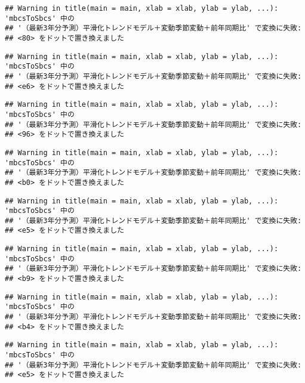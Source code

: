 \documentclass[]{article}
\begin{document}
\begin{verbatim}
## Warning in title(main = main, xlab = xlab, ylab = ylab, ...): 'mbcsToSbcs' 中の
## '（最新3年分予測）平滑化トレンドモデル＋変動季節変動＋前年同期比' で変換に失敗:
## <80> をドットで置き換えました
\end{verbatim}

\begin{verbatim}
## Warning in title(main = main, xlab = xlab, ylab = ylab, ...): 'mbcsToSbcs' 中の
## '（最新3年分予測）平滑化トレンドモデル＋変動季節変動＋前年同期比' で変換に失敗:
## <e6> をドットで置き換えました
\end{verbatim}

\begin{verbatim}
## Warning in title(main = main, xlab = xlab, ylab = ylab, ...): 'mbcsToSbcs' 中の
## '（最新3年分予測）平滑化トレンドモデル＋変動季節変動＋前年同期比' で変換に失敗:
## <96> をドットで置き換えました
\end{verbatim}

\begin{verbatim}
## Warning in title(main = main, xlab = xlab, ylab = ylab, ...): 'mbcsToSbcs' 中の
## '（最新3年分予測）平滑化トレンドモデル＋変動季節変動＋前年同期比' で変換に失敗:
## <b0> をドットで置き換えました
\end{verbatim}

\begin{verbatim}
## Warning in title(main = main, xlab = xlab, ylab = ylab, ...): 'mbcsToSbcs' 中の
## '（最新3年分予測）平滑化トレンドモデル＋変動季節変動＋前年同期比' で変換に失敗:
## <e5> をドットで置き換えました
\end{verbatim}

\begin{verbatim}
## Warning in title(main = main, xlab = xlab, ylab = ylab, ...): 'mbcsToSbcs' 中の
## '（最新3年分予測）平滑化トレンドモデル＋変動季節変動＋前年同期比' で変換に失敗:
## <b9> をドットで置き換えました
\end{verbatim}

\begin{verbatim}
## Warning in title(main = main, xlab = xlab, ylab = ylab, ...): 'mbcsToSbcs' 中の
## '（最新3年分予測）平滑化トレンドモデル＋変動季節変動＋前年同期比' で変換に失敗:
## <b4> をドットで置き換えました
\end{verbatim}

\begin{verbatim}
## Warning in title(main = main, xlab = xlab, ylab = ylab, ...): 'mbcsToSbcs' 中の
## '（最新3年分予測）平滑化トレンドモデル＋変動季節変動＋前年同期比' で変換に失敗:
## <e5> をドットで置き換えました
\end{verbatim}
\end{document}
